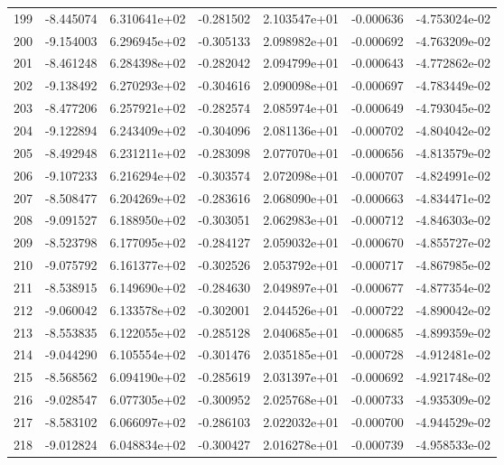 \begin{tabular}{rrrrrrr}
 199 &  -8.445074 &  6.310641e+02 & -0.281502 &  2.103547e+01 &   -0.000636 & -4.753024e-02 \\
 200 &  -9.154003 &  6.296945e+02 & -0.305133 &  2.098982e+01 &   -0.000692 & -4.763209e-02 \\
 201 &  -8.461248 &  6.284398e+02 & -0.282042 &  2.094799e+01 &   -0.000643 & -4.772862e-02 \\
 202 &  -9.138492 &  6.270293e+02 & -0.304616 &  2.090098e+01 &   -0.000697 & -4.783449e-02 \\
 203 &  -8.477206 &  6.257921e+02 & -0.282574 &  2.085974e+01 &   -0.000649 & -4.793045e-02 \\
 204 &  -9.122894 &  6.243409e+02 & -0.304096 &  2.081136e+01 &   -0.000702 & -4.804042e-02 \\
 205 &  -8.492948 &  6.231211e+02 & -0.283098 &  2.077070e+01 &   -0.000656 & -4.813579e-02 \\
 206 &  -9.107233 &  6.216294e+02 & -0.303574 &  2.072098e+01 &   -0.000707 & -4.824991e-02 \\
 207 &  -8.508477 &  6.204269e+02 & -0.283616 &  2.068090e+01 &   -0.000663 & -4.834471e-02 \\
 208 &  -9.091527 &  6.188950e+02 & -0.303051 &  2.062983e+01 &   -0.000712 & -4.846303e-02 \\
 209 &  -8.523798 &  6.177095e+02 & -0.284127 &  2.059032e+01 &   -0.000670 & -4.855727e-02 \\
 210 &  -9.075792 &  6.161377e+02 & -0.302526 &  2.053792e+01 &   -0.000717 & -4.867985e-02 \\
 211 &  -8.538915 &  6.149690e+02 & -0.284630 &  2.049897e+01 &   -0.000677 & -4.877354e-02 \\
 212 &  -9.060042 &  6.133578e+02 & -0.302001 &  2.044526e+01 &   -0.000722 & -4.890042e-02 \\
 213 &  -8.553835 &  6.122055e+02 & -0.285128 &  2.040685e+01 &   -0.000685 & -4.899359e-02 \\
 214 &  -9.044290 &  6.105554e+02 & -0.301476 &  2.035185e+01 &   -0.000728 & -4.912481e-02 \\
 215 &  -8.568562 &  6.094190e+02 & -0.285619 &  2.031397e+01 &   -0.000692 & -4.921748e-02 \\
 216 &  -9.028547 &  6.077305e+02 & -0.300952 &  2.025768e+01 &   -0.000733 & -4.935309e-02 \\
 217 &  -8.583102 &  6.066097e+02 & -0.286103 &  2.022032e+01 &   -0.000700 & -4.944529e-02 \\
 218 &  -9.012824 &  6.048834e+02 & -0.300427 &  2.016278e+01 &   -0.000739 & -4.958533e-02 \\

\end{tabular}

